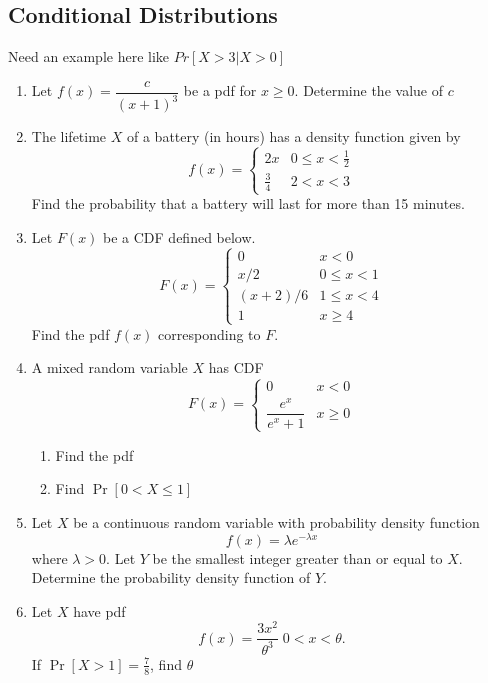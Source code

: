 \documentclass[../main.tex]{subfiles}
\begin{document}
\subsection{Conditional Distributions}
Need an example here like $Pr[X>3 | X>0]$

\begin{exercises}
\begin{enumerate}
	\item Let $f(x) = \dfrac{c}{(x+1)^3}$ be a pdf for $x \geq 0$. Determine the value of $c$ %
	
	\item The lifetime $X$ of a battery (in hours)
	has a density function given by
	$$f(x) = 
	\begin{cases}
		2x & 0 \leq x < \frac12 \\
		\frac34 & 2 < x < 3 
	\end{cases}$$
	Find the probability that a battery will last for more than 15 minutes. %
	
	\item %
	Let $F(x)$ be a CDF defined below.
	$$F(x) = 
	\begin{cases}
		0	& x<0\\
		x/2 	& 0 \leq x < 1 \\
		(x+2)/6	& 1 \leq x < 4 \\
		1		& x \geq 4
	\end{cases}$$
	Find the pdf $f(x)$ corresponding to $F$.
	
	\item %
	A mixed random variable $X$ has CDF
	$$F(x) = 
	\begin{cases}
	0		& x<0\\
	\dfrac{e^x}{e^x+1}	& x \geq 0
	\end{cases}$$
	\begin{enumerate}
		\item Find the pdf
		\item Find $\Pr[0 < X \leq 1]$
	\end{enumerate}
	
	\item %
	Let $X$ be a continuous random variable with probability density function
		$$f(x) = \lambda e^{-\lambda x}$$
		where $\lambda > 0$. Let $Y$ be the smallest integer greater than or equal to $X$.
	Determine the probability density function of $Y$.
	
	\item %
	Let $X$ have pdf $$f(x) = \dfrac{3x^2}{\theta^3} \;
	0 < x < \theta.$$ If $\Pr[X>1] = \frac78$, find $\theta$
	

\end{enumerate}
\end{exercises}
\end{document}
